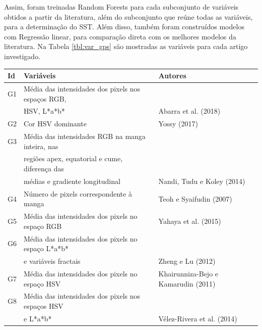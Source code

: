 Assim, foram treinadas Random Forests para cada subconjunto de variáveis obtidos a partir da literatura, além do subconjunto que reúne todas as variáveis, para a determinação do SST. Além disso, também foram construídos modelos com Regressão linear, para comparação direta com os melhores modelos da literatura. Na Tabela \ref{tbl:var_gps} são mostradas as variáveis para cada artigo investigado.

\begin{longtable}{m{1cm} m{10cm} m{3.5cm}}
\hline
Id  & Variáveis                                                                                                                                    & Autores                             \\ \hline
G1  & Média das intensidades dos pixels nos espaços RGB, \\ & HSV, L*a*b*                                                                               & Abarra et al. (2018)                \\ \hline
G2  & Cor HSV dominante                                                                                                                            & Yossy (2017)                        \\ \hline
G3  & Média das intensidades RGB na manga inteira, nas \\ &  regiões apex, equatorial e cume, diferença das \\ & médias e gradiente longitudinal     & Nandi, Tudu e Koley (2014)          \\ \hline
G4  & Número de pixels correspondente à manga                                                                                                      & Teoh e Syaifudin (2007)             \\ \hline
G5  & Média das intensidades dos pixels no espaço RGB                                                                                              & Yahaya et al. (2015)                \\ \hline
G6  & Média das intensidades dos pixels no espaço L*a*b* \\ & e variáveis fractais 																 	& Zheng e Lu (2012)                   \\ \hline
G7  & Média das intensidades dos pixels no espaço HSV                                                                                              & Khairunniza-Bejo e Kamarudin (2011) \\ \hline
G8  & Média das intensidades dos pixels nos espaços HSV \\ & e L*a*b*                                                                                   & Vélez-Rivera et al. (2014)          \\ \hline

\end{longtable}

